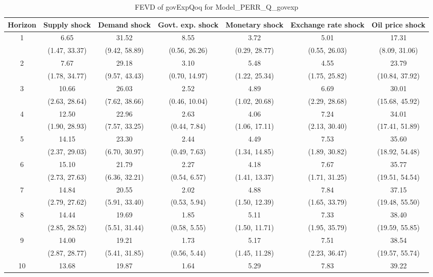 \documentclass{article}
\begin{document}
\begin{table}
	\footnotesize
	\caption{FEVD of govExpQoq for Model_PERR_Q_govexp}
	\begin{tabular}{ccccccc}
		Horizon & Supply shock & Demand shock & Govt. exp. shock & Monetary shock & Exchange rate shock & Oil price shock\\ \hline
		\multirow{2}{*}{1} & 6.65 & 31.52 & 8.55 & 3.72 & 5.01 & 17.31\\
		 & (1.47, 33.37) & (9.42, 58.89) & (0.56, 26.26) & (0.29, 28.77) & (0.55, 26.03) & (8.09, 31.06)\\
		\multirow{2}{*}{2} & 7.67 & 29.18 & 3.10 & 5.48 & 4.55 & 23.79\\
		 & (1.78, 34.77) & (9.57, 43.43) & (0.70, 14.97) & (1.22, 25.34) & (1.75, 25.82) & (10.84, 37.92)\\
		\multirow{2}{*}{3} & 10.66 & 26.03 & 2.52 & 4.89 & 6.69 & 30.01\\
		 & (2.63, 28.64) & (7.62, 38.66) & (0.46, 10.04) & (1.02, 20.68) & (2.29, 28.68) & (15.68, 45.92)\\
		\multirow{2}{*}{4} & 12.50 & 22.96 & 2.63 & 4.06 & 7.24 & 34.01\\
		 & (1.90, 28.93) & (7.57, 33.25) & (0.44, 7.84) & (1.06, 17.11) & (2.13, 30.40) & (17.41, 51.89)\\
		\multirow{2}{*}{5} & 14.15 & 23.30 & 2.44 & 4.49 & 7.53 & 35.60\\
		 & (2.37, 29.03) & (6.70, 30.97) & (0.49, 7.63) & (1.34, 14.85) & (1.89, 30.82) & (18.92, 54.48)\\
		\multirow{2}{*}{6} & 15.10 & 21.79 & 2.27 & 4.18 & 7.67 & 35.77\\
		 & (2.73, 27.63) & (6.36, 32.21) & (0.54, 6.57) & (1.41, 13.37) & (1.71, 31.25) & (19.51, 54.54)\\
		\multirow{2}{*}{7} & 14.84 & 20.55 & 2.02 & 4.88 & 7.84 & 37.15\\
		 & (2.79, 27.62) & (5.91, 33.40) & (0.53, 5.94) & (1.50, 12.39) & (1.65, 33.79) & (19.48, 55.50)\\
		\multirow{2}{*}{8} & 14.44 & 19.69 & 1.85 & 5.11 & 7.33 & 38.40\\
		 & (2.85, 28.52) & (5.51, 31.44) & (0.58, 5.55) & (1.50, 11.71) & (1.95, 35.79) & (19.59, 55.85)\\
		\multirow{2}{*}{9} & 14.00 & 19.21 & 1.73 & 5.17 & 7.51 & 38.54\\
		 & (2.87, 28.77) & (5.41, 31.85) & (0.56, 5.44) & (1.45, 11.28) & (2.23, 36.47) & (19.57, 55.74)\\
		\multirow{2}{*}{10} & 13.68 & 19.87 & 1.64 & 5.29 & 7.83 & 39.22\\

\end{tabular}
\end{table}
\end{document}
